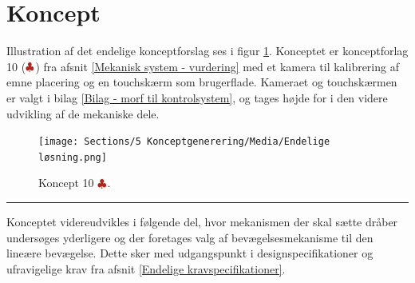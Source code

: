 \section{Koncept} \label{Endelig koncept}
Illustration af det endelige konceptforslag ses i figur \ref{fig: endelig koncept}. Konceptet er konceptforlag 10 ($\protect\mathcolor{BrickRed}{\clubsuit}$) fra afsnit \ref{Mekanisk system - vurdering} med et kamera til kalibrering af emne placering og en touchskærm som brugerflade. Kameraet og touchskærmen er valgt i bilag \ref{Bilag - morf til kontrolsystem}, og tages højde for i den videre udvikling af de mekaniske dele. 

\begin{figure}[H]
    \centering
    \texttt{[image: Sections/5 Konceptgenerering/Media/Endelige løsning.png]}
    \caption{Koncept 10 $\protect\mathcolor{BrickRed}{\clubsuit}$. }
    \label{fig: endelig koncept}
\end{figure} \plainbreak{-0.5}

Konceptet videreudvikles i følgende del, hvor mekanismen der skal sætte dråber undersøges yderligere og der foretages valg af bevægelsesmekanisme til den lineære bevægelse. Dette sker med udgangspunkt i designspecifikationer og ufravigelige krav fra afsnit \ref{Endelige kravspecifikationer}.





